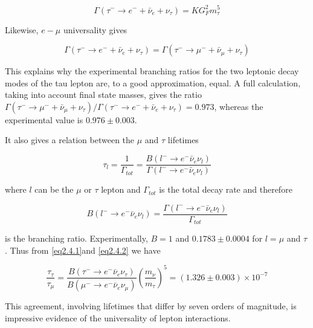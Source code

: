 	\begin{equation}
	\Gamma(\tau^{-}\rightarrow e^{-} + \bar{\nu}_{e} + \nu_{\tau}) = KG_{F}^{2}m_{\tau}^{5}
	\end{equation}

	Likewise, $e - \mu$ universality gives

	\begin{equation}
	\Gamma(\tau^{-}\rightarrow e^{-} + \bar{\nu}_{e} + \nu_{\tau}) = \Gamma(\tau^{-}\rightarrow \mu^{-} + \bar{\nu}_{\mu} + \nu_{\tau})
	\end{equation}

	This explains why the experimental branching ratios for the two leptonic decay modes of the tau lepton are, to a good approximation, equal. A full calculation, taking into account final state masses, gives the ratio $\Gamma(\tau^{-}\rightarrow \mu^{-} + \bar{\nu}_{\mu} + \nu_{\tau})/\Gamma(\tau^{-}\rightarrow e^{-} + \bar{\nu}_{e} + \nu_{\tau})=0.973$, whereas the experimental value is $0.976\pm0.003$.

	It also gives a relation between the $\mu$ and $\tau$ lifetimes 

	\begin{equation}
	\tau_{l}= \frac{1}{\Gamma_{tot}} = \frac{B(l^{-}\rightarrow e^{-}\bar{\nu}_{e}\nu_{l})}{\Gamma(l^{-}\rightarrow e^{-}\bar{\nu}_{e}\nu_{l})}
	\end{equation}

	where $l$ can be the $\mu$ or $\tau$ lepton and $\Gamma_{tot}$ is the total decay rate and therefore

	\begin{equation}
	B(l^{-}\rightarrow e^{-}\bar{\nu}_{e}\nu_{l}) = \frac{\Gamma(l^{-}\rightarrow e^{-}\bar{\nu}_{e}\nu_{l})}{\Gamma_{tot}}
	\end{equation}

	is the branching ratio. Experimentally, $B=1$ and $0.1783\pm0.0004$ for $l=\mu$ and $\tau$\cite{Patrignani:2016xqp}. Thus from \ref{eq2.4.1}and \ref{eq2.4.2} we have

	\begin{equation}
	\frac{\tau_{\tau}}{\tau_{\mu}} = \frac{B(\tau^{-}\rightarrow e^{-}\bar{\nu}_{e}\nu_{\tau})}{B(\mu^{-}\rightarrow e^{-}\bar{\nu}_{e}\nu_{\mu})}(\frac{m_{\nu}}{m_{\tau}})^{5} = (1.326\pm0.003)\times 10^{-7}
	\end{equation}

	This agreement, involving lifetimes that differ by seven orders of magnitude, is impressive evidence of the universality of lepton interactions.

